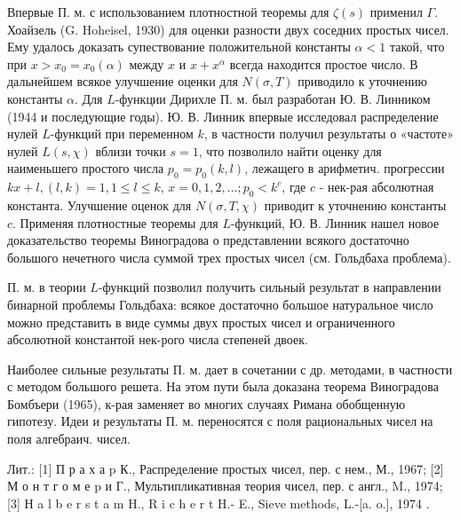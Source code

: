 \documentclass[10pt]{article}
\begin{document}
Впервые П. м. с использованием плотностной теоремы для $\zeta(s)$ применил $\Gamma$. Хоайзель (G. Hoheisel, 1930) для оценки разности двух соседних простых чисел. Ему удалось доказать супествование положительной константы $\alpha<1$ такой, что при $x>x_{0}=x_{0}(\alpha)$ между $x$ и $x+x^{\alpha}$ всегда находится простое число. В дальнейшем всякое улучшение оценки для $N(\sigma, T)$ приводило к уточнению константы $\alpha$. Для $L$-функции Дирихле П. м. был разработан Ю. В. Линником (1944 и последующие годы). Ю. В. Линник впервые исследовал распределение нулей $L$-функций при переменном $k$, в частности получил результаты о «частоте» нулей $L(s, \chi)$ вблизи точки $s=1$, что позволило найти оценку для наименьшего простого числа $p_{0}=p_{0}(k, l)$, лежащего в арифметич. прогрессии $k x+l,(l, k)=1,1 \leqslant l \leqslant k$, $x=0,1,2, \ldots ; p_{0}<k^{c}$, где $c$ - нек-рая абсолютная константа. Улучшение оценок для $N(\sigma, T, \chi)$ приводит к уточнению константы $c$. Применяя плотностные теоремы для $L$-функций, Ю. В. Линник нашел новое доказательство теоремы Виноградова о представлении всякого достаточно большого нечетного числа суммой трех простых чисел (см. Гольдбаха проблема).



П. м. в теории $L$-функций позволил получить сильный результат в направлении бинарной проблемы Гольдбаха: всякое достаточно большое натуральное число можно представить в виде суммы двух простых чисел и ограниченного абсолютной константой нек-рого числа степеней двоек.



Наиболее сильные результаты П. м. дает в сочетании с др. методами, в частности с методом большого решета. На этом пути была доказана теорема Виноградова Бомбъери (1965), к-рая заменяет во многих случаях Римана обобщенную гипотезу. Идеи и результаты П. м. переносятся с поля рациональных чисел на поля алгебраич. чисел.



Лит.: [1] П р а х а $\mathrm{p}$ К., Распределение простых чисел, пер. с нем., М., 1967; [2] М о н т г о м е p и Г., Мультипликативная теория чисел, пер. с англ., M., 1974; [3] Н a l b e r s t a m H., R i c h e r t H.- E., Sieve methods, L.-[a. o.], 1974 .
\end{document}

